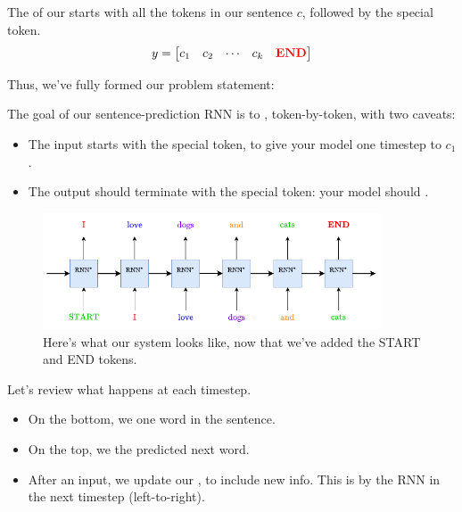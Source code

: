         \begin{definition}
            The  of our  starts with all the tokens in our sentence $c$, followed by the special  token.
            \begin{equation*}
                y = \begin{bmatrix}
                    c_1 & c_2 & \cdots & c_k & \textbf{\textcolor{red}{END}}
                \end{bmatrix}
            \end{equation*}
        
        \end{definition}

        Thus, we've fully formed our problem statement:\\

        \begin{concept}
            The goal of our sentence-prediction RNN is to , token-by-token, with two caveats:

            \begin{itemize}
                \item The input starts with the special  token, to give your model one timestep to  $c_1$.
                \item The output should terminate with the special  token: your model should .
            \end{itemize}
        \end{concept}


        \begin{figure}[H]
            \centering
            \includegraphics[width=100mm]{images/rnn_images/rnn_predict_startend.png}
            \caption*{Here's what our system looks like, now that we've added the START and END tokens.}
        \end{figure}

        Let's review what happens at each timestep.

        \begin{itemize}
            \item On the bottom, we  one word in the sentence.

            \item On the top, we  the predicted next word.

            \item After an input, we update our , to include new info. This is  by the RNN in the next timestep (left-to-right).
        \end{itemize}









